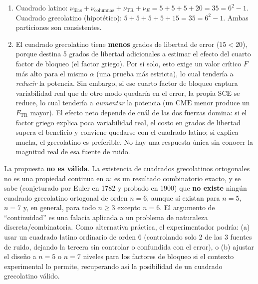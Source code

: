 \begin{solproblema}[prob:68ab492]
	\begin{enumerate}
		\item Cuadrado latino: $\nu_{\text{filas}} + \nu_{\text{columnas}} + \nu_{\text{TR}} + \nu_E = 5+5+5+20 = 35 = 6^2-1$. Cuadrado grecolatino (hipotético): $5+5+5+5+15 = 35 = 6^2-1$. Ambas particiones son consistentes.
		\item El cuadrado grecolatino tiene \textbf{menos} grados de libertad de error ($15 < 20$), porque destina 5 grados de libertad adicionales a estimar el efecto del cuarto factor de bloqueo (el factor griego). Por sí solo, esto exige un valor crítico $F$ más alto para el mismo $\alpha$ (una prueba más estricta), lo cual tendería a \emph{reducir} la potencia. Sin embargo, si ese cuarto factor de bloqueo captura variabilidad real que de otro modo quedaría en el error, la propia $\text{SCE}$ se reduce, lo cual tendería a \emph{aumentar} la potencia (un $\text{CME}$ menor produce un $F_{\text{TR}}$ mayor). El efecto neto depende de cuál de las dos fuerzas domina: si el factor griego explica poca variabilidad real, el costo en grados de libertad supera el beneficio y conviene quedarse con el cuadrado latino; si explica mucha, el grecolatino es preferible. No hay una respuesta única sin conocer la magnitud real de esa fuente de ruido.
	\end{enumerate}
\end{solproblema}

\begin{solproblema}
	La propuesta \textbf{no es válida}. La existencia de cuadrados grecolatinos ortogonales no es una propiedad continua en $n$: es un resultado combinatorio exacto, y se sabe (conjeturado por Euler en 1782 y probado en 1900) que \textbf{no existe} ningún cuadrado grecolatino ortogonal de orden $n=6$, aunque sí existan para $n=5$, $n=7$ y, en general, para todo $n \geq 3$ excepto $n=6$. El argumento de ``continuidad'' es una falacia aplicada a un problema de naturaleza discreta/combinatoria. Como alternativa práctica, el experimentador podría: (a) usar un cuadrado latino ordinario de orden 6 (controlando solo 2 de las 3 fuentes de ruido, dejando la tercera sin controlar o confundida con el error), o (b) ajustar el diseño a $n=5$ o $n=7$ niveles para los factores de bloqueo si el contexto experimental lo permite, recuperando así la posibilidad de un cuadrado grecolatino válido.
\end{solproblema}

